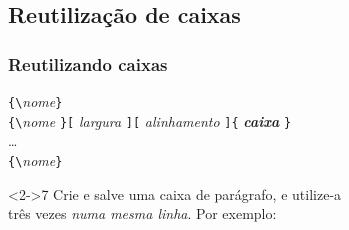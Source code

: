 \documentclass[handout,10pt]{beamer}
\begin{document}
\subsection{Reutilização de caixas}
\begin{frame}[fragile]
	\frametitle{Reutilizando caixas}
	
	\begin{block}{}
		\verb|{\|\textit{nome}\verb|}|\\
		\verb|{\|\textit{nome}%
		\verb|}[|%
			\textit{largura}%
		\verb|][|%
			\textit{alinhamento}%
		\verb|]{|%
			\textit{\textbf{caixa}}%
		\verb|}|\\
		\dots\\
		\verb|{\|\textit{nome}\verb|}|
	\end{block}
	
	\begin{atividade}<2->{7}
		\centering
		Crie e salve uma caixa de parágrafo, e utilize-a\\ três vezes \emph{numa
		mesma linha}. Por exemplo:
	
		\smallskip
	
		\usebox{\myparboxA}\hfill
		\usebox{\myparboxA}\hfill
		\usebox{\myparboxA}
	\end{atividade}
	
\end{frame}
\end{document}
